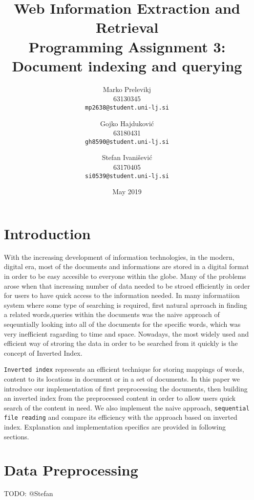 \documentclass{article}
\title{
	Web Information Extraction and Retrieval\\
	Programming Assignment 3: \\
	Document indexing and querying
}
\author{
	Marko Prelevikj\\
	63130345\\
	\texttt{mp2638@student.uni-lj.si}
	\and
	Gojko Hajduković\\
	63180431\\
	\texttt{gh8590@student.uni-lj.si}
	\and
	Stefan Ivanišević\\
	63170405\\
	\texttt{si0539@student.uni-lj.si}
}
\date{May 2019}
\begin{document}
	
\maketitle
\section{Introduction}
With the increasing development of information technologies, in the modern, digital era, most of the documents and informations are stored in a digital format in order to be easy accesible to everyone within the globe. Many of the problems arose when that increasing number of data needed to be stroed efficiently in order for users to have quick access to the information needed. In many informatiion system where some type of searching is required, first natural aprroach in finding a related words,queries within the documents was the naive approach of seqeuntially looking into all of the documents for the specific words, which was very inefficient ragarding to time and space. Nowadays, the most widely used and efficient way of stroring the data in order to be searched from it quickly is the concept of Inverted Index. 

\texttt{Inverted index} represents an efficient technique for storing mappings of words, content to its locations in document or in a set of documents. In this paper we introduce our implementation of first preprocessing the documents, then building an inverted index from the preprocessed content in order to allow users quick search of the content in need. We also implement the naive approach, \texttt{sequential file reading} and compare its efficiency with the approach based on inverted index. Explanation and implementation specifics are provided in following sections.

\section{Data Preprocessing}
TODO: @Stefan
\end{document}
